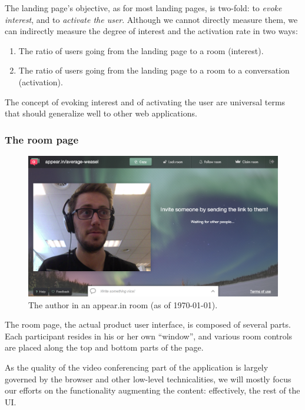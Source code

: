 The landing page's objective, as for most landing pages, is two-fold: to \emph{evoke interest}, and to \emph{activate the user}. Although we cannot directly measure them, we can indirectly measure the degree of interest and the activation rate in two ways:

\begin{enumerate}
  \item The ratio of users going from the landing page to a room (interest).
  \item The ratio of users going from the landing page to a room to a conversation (activation).
\end{enumerate}

The concept of evoking interest and of activating the user are universal terms that should generalize well to other web applications.

\subsubsection{The room page}

\begin{figure}[t]
  \centering
    \includegraphics[width=\textwidth]{Figures/screenshots/appearin/in-room}
    \caption{The author in an appear.in room (as of \today).}
    \label{fig:appearin-room}
\end{figure}

The room page, the actual product user interface, is composed of several parts. Each participant resides in his or her own ``window'', and various room controls are placed along the top and bottom parts of the page.

As the quality of the video conferencing part of the application is largely governed by the browser and other low-level technicalities, we will mostly focus our efforts on the functionality augmenting the content: effectively, the rest of the UI.

